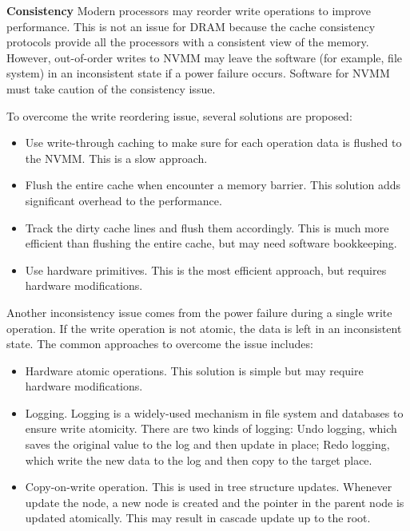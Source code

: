 \textbf{Consistency} Modern processors may reorder write operations to improve
performance. This is not an issue for DRAM because the cache consistency
protocols provide all the processors with a consistent view of the memory.
However, out-of-order writes to NVMM may leave the software (for example,
file system) in an inconsistent state if a power failure occurs. Software
for NVMM must take caution of the consistency issue. 

To overcome the write reordering issue, several solutions are proposed:

\begin{itemize}
\item Use write-through caching to make sure for each operation
data is flushed to the NVMM. This is a slow approach. 
\item Flush the entire cache when encounter a memory barrier. This solution
adds significant overhead to the performance.
\item Track the dirty cache lines and flush them accordingly. This is much
more efficient than flushing the entire cache, but may need software bookkeeping.
\item Use hardware primitives. This is the most efficient approach, but requires
hardware modifications.
\end{itemize}

Another inconsistency issue comes from the power failure during a single
write operation. If the write operation is not atomic, the data is left
in an inconsistent state. The common approaches to overcome the issue includes:

\begin{itemize}
\item Hardware atomic operations. This solution is simple but may require
hardware modifications.
\item Logging. Logging is a widely-used mechanism in file system and databases
to ensure write atomicity. There are two kinds of logging: Undo logging, which
saves the original value to the log and then update in place; Redo logging,
which write the new data to the log and then copy to the target place.
\item Copy-on-write operation. This is used in tree structure updates. Whenever
update the node, a new node is created and the pointer in the parent node is
updated atomically. This may result in cascade update up to the root.
\end{itemize}
